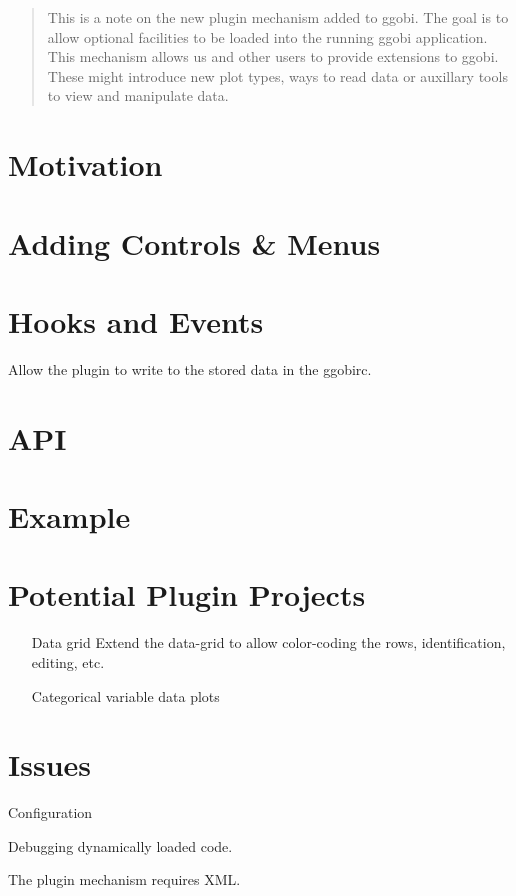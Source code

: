 \documentclass{article}
\begin{document}
\begin{abstract}
  This is a note on the new plugin mechanism added to ggobi. The goal
  is to allow optional facilities to be loaded into the running ggobi
  application.
 This mechanism allows us and other users to provide extensions
 to ggobi. These  might introduce new plot types, ways
 to read data or auxillary tools to view and manipulate
 data.

\end{abstract}

\section{Motivation}

\section{Adding Controls \& Menus}

\section{Hooks and Events}
Allow the plugin to write to the stored data
in the ggobirc.

\section{API}

\section{Example}


\section{Potential Plugin Projects}

\begin{itemize}

\item[Data grid]
Extend the data-grid to 
allow color-coding the rows, identification,
editing, etc.

\item[Categorical variable data plots]

\end{itemize}



\section{Issues}
Configuration

Debugging dynamically loaded code.

The plugin mechanism requires XML.
\end{document}
